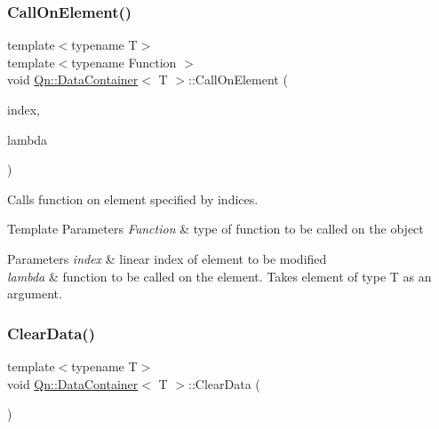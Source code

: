 \subsubsection{\texorpdfstring{Call\+On\+Element()}{CallOnElement()}\hspace{0.1cm}{\footnotesize\ttfamily [4/4]}}
{\footnotesize\ttfamily template$<$typename T$>$ \\
template$<$typename Function $>$ \\
void \mbox{\hyperlink{classQn_1_1DataContainer}{Qn\+::\+Data\+Container}}$<$ T $>$\+::Call\+On\+Element (\begin{DoxyParamCaption}\item[{const long}]{index,  }\item[{Function \&\&}]{lambda }\end{DoxyParamCaption})\hspace{0.3cm}{\ttfamily [inline]}}

Calls function on element specified by indices. 
\begin{DoxyTemplParams}{Template Parameters}
{\em Function} & type of function to be called on the object \\
\hline
\end{DoxyTemplParams}

\begin{DoxyParams}{Parameters}
{\em index} & linear index of element to be modified \\
\hline
{\em lambda} & function to be called on the element. Takes element of type T as an argument. \\
\hline
\end{DoxyParams}
\mbox{\label{classQn_1_1DataContainer_acd8c7e0e00f681929bf29f35830ff232}} 
\subsubsection{\texorpdfstring{Clear\+Data()}{ClearData()}}
{\footnotesize\ttfamily template$<$typename T$>$ \\
void \mbox{\hyperlink{classQn_1_1DataContainer}{Qn\+::\+Data\+Container}}$<$ T $>$\+::Clear\+Data (\begin{DoxyParamCaption}{ }\end{DoxyParamCaption})\hspace{0.3cm}{\ttfamily [inline]}}

